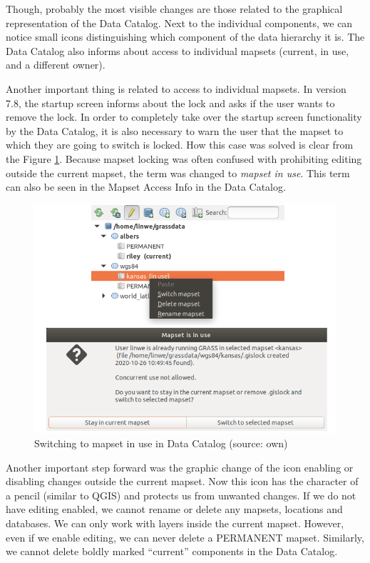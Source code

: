 \documentclass[a4paper,10pt,twoside]{article}
\begin{document}
\newpage Though, probably the most visible changes are those related to the graphical representation of the Data Catalog. Next to the individual components, we can notice small icons distinguishing which component of the data hierarchy it is. The Data Catalog also informs about access to individual mapsets (current, in use, and a different owner).

Another important thing is related to access to individual mapsets. In version 7.8, the startup screen informs about the lock and asks if the user wants to remove the lock.
In order to completely take over the startup screen functionality by the Data Catalog, it is also necessary to warn the user that the mapset to which they are going to switch is locked. How this case was solved is clear from the Figure \ref{fig:data_catalog_switch_new}. Because mapset locking was often confused with prohibiting editing outside the current mapset, the term was changed to \textit{mapset in use}. This term can also be seen in the Mapset Access Info in the Data Catalog.

\vspace{0.3cm}
\begin{figure}[hbt!] 
\begin{center}
\includegraphics[width=12cm]{../pictures/data_catalog_switch.png} 
\caption[Switching to mapset in use in Data Catalog]{Switching to mapset in use in Data Catalog (source: own)}
\label{fig:data_catalog_switch_new}
\end{center}
\end{figure}

\noindent Another important step forward was the graphic change of the icon enabling or disabling changes outside the current mapset. Now this icon has the character of a pencil (similar to QGIS) and protects us from unwanted changes. If we do not have editing enabled, we cannot rename or delete any mapsets, locations and databases. We can only work with layers inside the current mapset. However, even if we enable editing, we can never delete a PERMANENT mapset. Similarly, we cannot delete boldly marked ``current” components in the Data Catalog.
\end{document}
